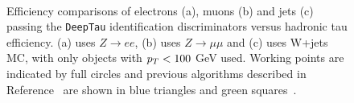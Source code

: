 \begin{figure}[!hbtp]
\centering
     \\
\caption{Efficiency comparisons of electrons (a), muons (b) and jets (c) passing the \texttt{DeepTau} identification discriminators versus hadronic tau efficiency. (a) uses $Z\rightarrow ee$, (b) uses $Z\rightarrow \mu\mu$ and (c) uses W+jets MC, with only objects with $p_{T}<100$ GeV used. Working points are indicated by full circles and previous algorithms described in Reference~\cite{CMS:2018jrd} are shown in blue triangles and green squares~\cite{CMS:2022prd}.}
\label{fig:deeptau_misid}
\end{figure}

